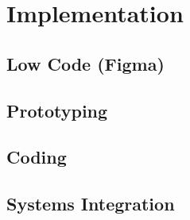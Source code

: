 %
%
\chapter{Implementation}

\section{Low Code (Figma)}

\section{Prototyping}

\section{Coding}

\section{Systems Integration}

\clearpage